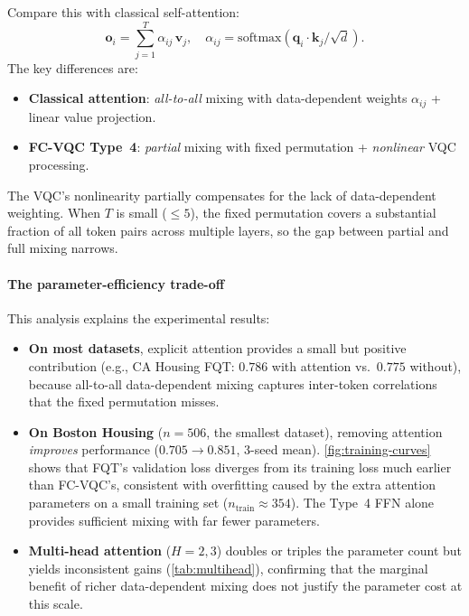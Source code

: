 \documentclass[10pt,conference]{IEEEtran}
\begin{document}
Compare this with classical self-attention:
\begin{equation}
    \mathbf{o}_i = \sum_{j=1}^{T} \alpha_{ij}\, \mathbf{v}_j, \quad
    \alpha_{ij} = \mathrm{softmax}(\mathbf{q}_i \!\cdot\! \mathbf{k}_j / \sqrt{d}).
    \label{eq:classical-attn}
\end{equation}
The key differences are:
\begin{itemize}[leftmargin=*]
    \item \textbf{Classical attention}: \emph{all-to-all} mixing with data-dependent weights $\alpha_{ij}$ + linear value projection.
    \item \textbf{FC-VQC Type~4}: \emph{partial} mixing with fixed permutation + \emph{nonlinear} VQC processing.
\end{itemize}
The VQC's nonlinearity partially compensates for the lack of data-dependent weighting.
When $T$ is small (${\leq}5$), the fixed permutation covers a substantial fraction of all token pairs across multiple layers, so the gap between partial and full mixing narrows.

\paragraph{The parameter-efficiency trade-off}

This analysis explains the experimental results:
\begin{itemize}[leftmargin=*]
    \item \textbf{On most datasets}, explicit attention provides a small but positive contribution (e.g., CA Housing FQT: $0.786$ with attention vs.\ $0.775$ without), because all-to-all data-dependent mixing captures inter-token correlations that the fixed permutation misses.
    \item \textbf{On Boston Housing} ($n{=}506$, the smallest dataset), removing attention \emph{improves} performance ($0.705 \to 0.851$, 3-seed mean). \cref{fig:training-curves} shows that FQT's validation loss diverges from its training loss much earlier than FC-VQC's, consistent with overfitting caused by the extra attention parameters on a small training set ($n_{\text{train}} \approx 354$). The Type~4 FFN alone provides sufficient mixing with far fewer parameters.
    \item \textbf{Multi-head attention} ($H{=}2,3$) doubles or triples the parameter count but yields inconsistent gains (\cref{tab:multihead}), confirming that the marginal benefit of richer data-dependent mixing does not justify the parameter cost at this scale.
\end{itemize}
\end{document}
